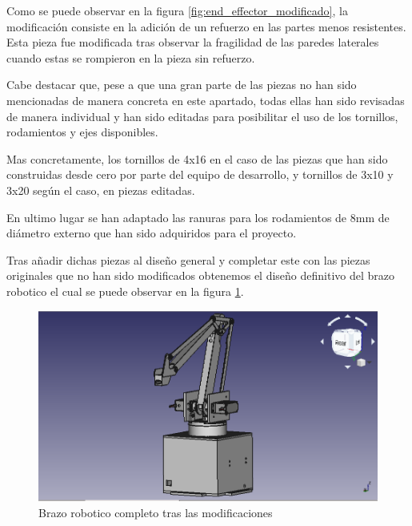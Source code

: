 Como se puede observar en la figura \ref{fig:end_effector_modificado}, la modificación consiste en la adición de un refuerzo en las partes menos resistentes. 
Esta pieza fue modificada tras observar la fragilidad de las paredes laterales cuando estas se rompieron en la pieza sin refuerzo.

Cabe destacar que, pese a que una gran parte de las piezas no han sido mencionadas de manera concreta en este apartado, todas ellas han sido revisadas de manera individual y han sido editadas para posibilitar el uso de los tornillos, rodamientos y ejes disponibles.

Mas concretamente, los tornillos de 4x16 en el caso de las piezas que han sido construidas desde cero por parte del equipo de desarrollo, y tornillos de 3x10 y 3x20 según el caso, en piezas editadas.

En ultimo lugar se han adaptado las ranuras para los rodamientos de 8mm de diámetro externo que han sido adquiridos para el proyecto.

Tras añadir dichas piezas al diseño general y completar este con las piezas originales que no han sido modificados obtenemos el diseño definitivo del brazo robotico el cual se puede observar en la figura \ref{fig:brazo_completo_modificado}.

\begin{figure}[H]
    \centering
    \includegraphics[width=.9\linewidth]{pictures/BrazoEntero.png}
    \caption{Brazo robotico completo tras las modificaciones}
    \label{fig:brazo_completo_modificado}
\end{figure}